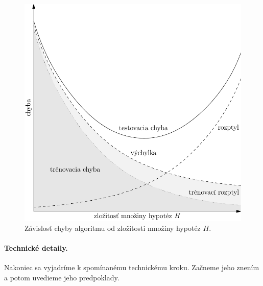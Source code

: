 \begin{figure}
  \centering
  \includegraphics[scale=0.8]{obrazky/krivky2.pdf}
  \caption{Závislosť chyby algoritmu od zložitosti množiny hypotéz $H$.}
  \label{img:hypo}
\end{figure}



\iffalse
\paragraph{Technické detaily.} \label{tradeoff:tech}
Nakoniec sa vyjadríme k spomínanému technickému kroku. Začneme jeho
znením a potom uvedieme jeho predpoklady.

